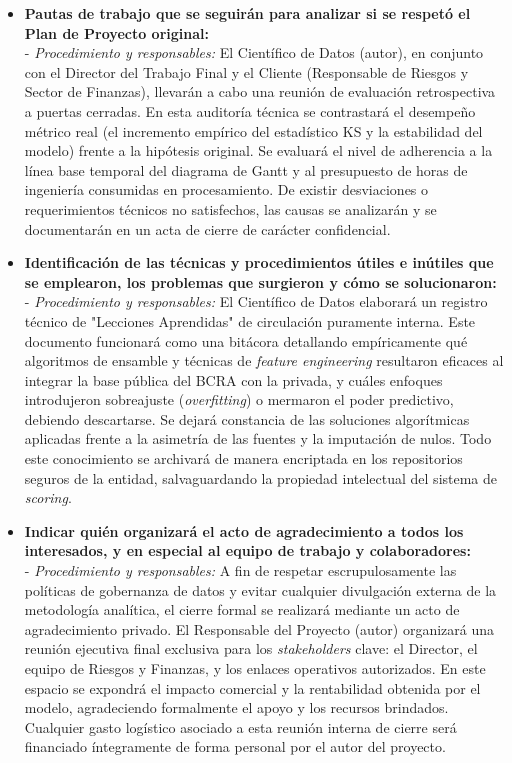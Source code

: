 \documentclass[
11pt, %
]{charter}
\begin{document}
\begin{itemize}
    \item \textbf{Pautas de trabajo que se seguirán para analizar si se respetó el Plan de Proyecto original:} \\
    - \textit{Procedimiento y responsables:} El Científico de Datos (autor), en conjunto con el Director del Trabajo Final y el Cliente (Responsable de Riesgos y Sector de Finanzas), llevarán a cabo una reunión de evaluación retrospectiva a puertas cerradas. En esta auditoría técnica se contrastará el desempeño métrico real (el incremento empírico del estadístico KS y la estabilidad del modelo) frente a la hipótesis original. Se evaluará el nivel de adherencia a la línea base temporal del diagrama de Gantt y al presupuesto de horas de ingeniería consumidas en procesamiento. De existir desviaciones o requerimientos técnicos no satisfechos, las causas se analizarán y se documentarán en un acta de cierre de carácter confidencial.

    \item \textbf{Identificación de las técnicas y procedimientos útiles e inútiles que se emplearon, los problemas que surgieron y cómo se solucionaron:} \\
    - \textit{Procedimiento y responsables:} El Científico de Datos elaborará un registro técnico de "Lecciones Aprendidas" de circulación puramente interna. Este documento funcionará como una bitácora detallando empíricamente qué algoritmos de ensamble y técnicas de \textit{feature engineering} resultaron eficaces al integrar la base pública del BCRA con la privada, y cuáles enfoques introdujeron sobreajuste (\textit{overfitting}) o mermaron el poder predictivo, debiendo descartarse. Se dejará constancia de las soluciones algorítmicas aplicadas frente a la asimetría de las fuentes y la imputación de nulos. Todo este conocimiento se archivará de manera encriptada en los repositorios seguros de la entidad, salvaguardando la propiedad intelectual del sistema de \textit{scoring}.

    \item \textbf{Indicar quién organizará el acto de agradecimiento a todos los interesados, y en especial al equipo de trabajo y colaboradores:} \\
    - \textit{Procedimiento y responsables:} A fin de respetar escrupulosamente las políticas de gobernanza de datos y evitar cualquier divulgación externa de la metodología analítica, el cierre formal se realizará mediante un acto de agradecimiento privado. El Responsable del Proyecto (autor) organizará una reunión ejecutiva final exclusiva para los \textit{stakeholders} clave: el Director, el equipo de Riesgos y Finanzas, y los enlaces operativos autorizados. En este espacio se expondrá el impacto comercial y la rentabilidad obtenida por el modelo, agradeciendo formalmente el apoyo y los recursos brindados. Cualquier gasto logístico asociado a esta reunión interna de cierre será financiado íntegramente de forma personal por el autor del proyecto.
\end{itemize}
\end{document}
